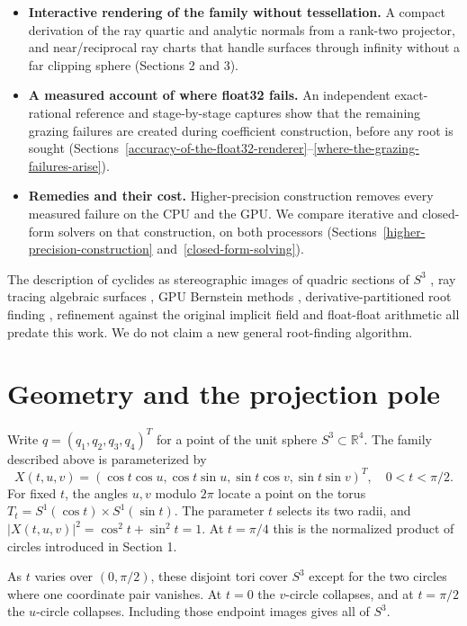 \documentclass{jcgt}
\providecommand{\tightlist}{\setlength{\itemsep}{0pt}\setlength{\parskip}{0pt}}
\begin{document}
\begin{itemize}
\tightlist
\item
  \textbf{Interactive rendering of the family without tessellation.} A
  compact derivation of the ray quartic and analytic normals from a
  rank-two projector, and near/reciprocal ray charts that handle
  surfaces through infinity without a far clipping sphere (Sections 2
  and 3).
\item
  \textbf{A measured account of where float32 fails.} An independent
  exact-rational reference and stage-by-stage captures show that the
  remaining grazing failures are created during coefficient
  construction, before any root is sought (Sections~\ref{accuracy-of-the-float32-renderer}--\ref{where-the-grazing-failures-arise}).
\item
  \textbf{Remedies and their cost.} Higher-precision construction
  removes every measured failure on the CPU and the GPU. We compare
  iterative and closed-form solvers on that construction, on both
  processors (Sections~\ref{higher-precision-construction} and~\ref{closed-form-solving}).
\end{itemize}

The description of cyclides as stereographic images of quadric sections
of \(S^3\) \citep{pottmann2012}, ray tracing algebraic surfaces
\citep{hanrahan1983}, GPU Bernstein methods \citep{seland2007},
derivative-partitioned root finding \citep{yuksel2022, peters2023},
refinement against the original implicit field \citep{szente2026} and
float-float arithmetic \citep{dekker1971} all predate this work. We do
not claim a new general root-finding algorithm.

\section{Geometry and the projection
pole}\label{geometry-and-the-projection-pole}

Write \(q=(q_1,q_2,q_3,q_4)^T\) for a point of the unit sphere
\(S^3\subset\mathbb R^4\). The family described above is parameterized
by \[
X(t,u,v)=(\cos t\cos u,\cos t\sin u,\sin t\cos v,\sin t\sin v)^T,
\quad 0<t<\pi/2.
\] For fixed \(t\), the angles \(u,v\) modulo \(2\pi\) locate a point on
the torus \(T_t=S^1(\cos t)\times S^1(\sin t)\). The parameter \(t\)
selects its two radii, and \(|X(t,u,v)|^2=\cos^2t+\sin^2t=1\). At
\(t=\pi/4\) this is the normalized product of circles introduced in
Section 1.

As \(t\) varies over \((0,\pi/2)\), these disjoint tori cover \(S^3\)
except for the two circles where one coordinate pair vanishes. At
\(t=0\) the \(v\)-circle collapses, and at \(t=\pi/2\) the \(u\)-circle
collapses. Including those endpoint images gives all of \(S^3\).
\end{document}
